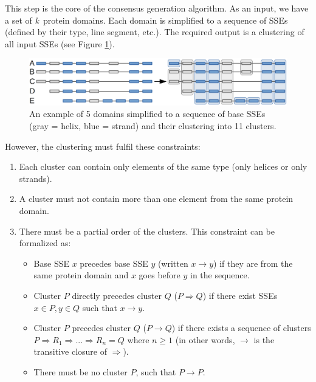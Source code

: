 \documentclass{article}
\begin{document}
\label{sec:merging}

This step is the core of the consensus generation algorithm. As an input, we
have a set of \emph{k}~protein domains. Each domain is simplified to a
sequence of SSEs (defined by their type, line segment, etc.). 
The required output is a clustering of all input SSEs (see Figure \ref{fig:clusters}).

\begin{figure}[h!]
  \centering\includegraphics[width=\linewidth]{figures/clusters.png}
  \caption{An example of 5 domains simplified to a sequence of base SSEs 
  (gray = helix, blue = strand) and their clustering into 11 clusters.}
  \label{fig:clusters}
\end{figure}

However, the clustering must fulfil these constraints:

\begin{enumerate}
\def\labelenumi{\arabic{enumi}.}
\item
  Each cluster can contain only elements of the same type (only helices
  or only strands).
\item
  A cluster must not contain more than one element from the same protein
  domain.
\item
  There must be a partial order of the clusters. This constraint can be formalized as:
  \begin{itemize}
    \item
      Base SSE \(x\) precedes base SSE \(y\) (written \(x \rightarrow y\)) if they
      are from the same protein domain and \(x\) goes before \(y\) in the sequence.
    \item
      Cluster \(P\) directly precedes cluster \(Q\) (\(P \Rightarrow Q\)) if there
      exist SSEs \(x \in P, y \in Q\) such that \(x \rightarrow y\).
    \item
      Cluster \(P\) precedes cluster \(Q\) (\(P \rightarrow Q\)) if there
      exists a sequence of clusters \(P \Rightarrow R_1 \Rightarrow ... 
      \Rightarrow R_n = Q\) where \(n \geq 1\) (in other words, \(\rightarrow\) 
      is the transitive closure of \(\Rightarrow\)).
    \item
      There must be no cluster \(P\), such that \(P \rightarrow P\).
  \end{itemize}
\end{enumerate}
\end{document}
